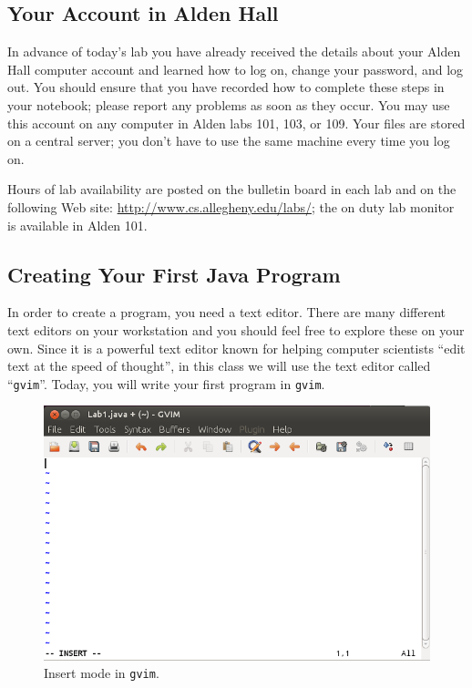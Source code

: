 \vspace*{-.3in}
\subsection*{Your Account in Alden Hall}

In advance of today's lab you have already received the details about your Alden Hall computer account and learned how to
log on, change your password, and log out.  You should ensure that you have recorded how to complete these steps in your
notebook; please report any problems as soon as they occur. You may use this account on any computer in Alden labs 101,
103, or 109. Your files are stored on a central server; you don't have to use the same machine every time you log on.

Hours of lab availability are posted on the bulletin board in each lab and on the following Web site:
\url{http://www.cs.allegheny.edu/labs/}; the on duty lab monitor is available in Alden 101.

\vspace*{-.1in}
\subsection*{Creating Your First Java Program}

In order to create a program, you need a text editor. There are many different text editors on your workstation and
you should feel free to explore these on your own. Since it is a powerful text editor known for helping computer
scientists ``edit text at the speed of thought'', in this class we will use the text editor called ``{\tt gvim}''.
Today, you will write your first program in {\tt gvim}.


\begin{figure}[htbp]
  \centering
  \includegraphics[width=4.5in]{images/gvim-insert}
  \caption{Insert mode in {\tt gvim}.}
  \label{gvim-insert}
\end{figure}

